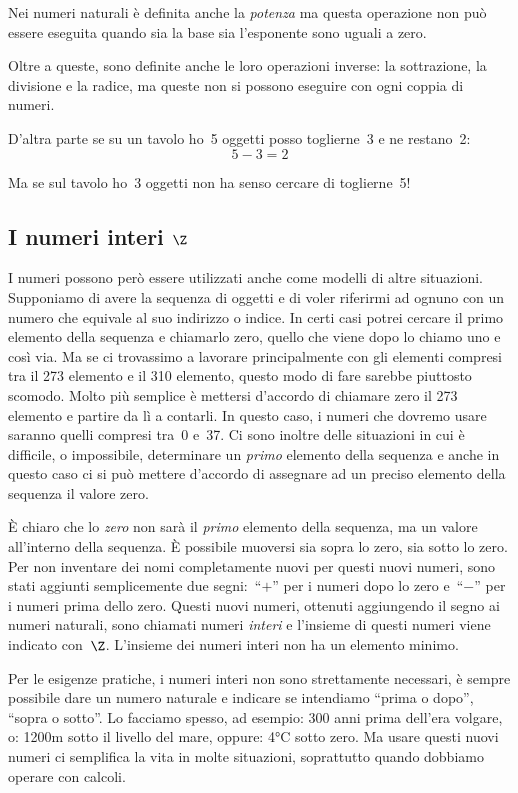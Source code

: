 Nei numeri naturali è definita anche la \emph{potenza} ma questa operazione 
non può essere eseguita quando sia la base sia l'esponente sono uguali a zero.

Oltre a queste, sono definite anche le loro operazioni inverse: la 
sottrazione, la divisione e la radice, ma queste non si possono eseguire
con ogni coppia di numeri.

D'altra parte se su un tavolo ho~5 oggetti posso toglierne~3 e ne restano~2:
\[5-3=2\]

Ma se sul tavolo ho~3 oggetti non ha senso cercare di toglierne~5!

\subsection{I numeri interi \(\Z\)}
\label{subsec:insnum_interi}

I numeri possono però essere utilizzati anche come modelli di altre 
situazioni. 
Supponiamo di avere la sequenza di oggetti e di voler riferirmi ad ognuno 
con un numero che equivale al suo indirizzo o indice. In certi casi potrei 
cercare il primo elemento della sequenza e chiamarlo zero, quello che viene 
dopo lo chiamo uno e così via. Ma se ci trovassimo a lavorare principalmente 
con gli elementi compresi tra il 273 elemento e il 310 elemento, questo 
modo di fare sarebbe piuttosto scomodo. 
Molto più semplice è mettersi d'accordo di chiamare zero il 273 elemento e 
partire da lì a contarli. In questo caso, i numeri che dovremo usare saranno 
quelli compresi tra~0 e~37. 
Ci sono inoltre delle situazioni in cui è difficile, o impossibile, 
determinare un \emph{primo} elemento della sequenza e anche in questo caso 
ci si può mettere d'accordo di assegnare ad un preciso elemento della 
sequenza il valore zero.

È chiaro che lo \emph{zero} non sarà il \emph{primo} elemento della 
sequenza, ma un valore all'interno della sequenza. 
È possibile muoversi sia sopra lo zero, sia sotto lo zero.
Per non inventare dei nomi completamente nuovi per questi nuovi 
numeri, sono stati aggiunti semplicemente due segni:~``\(+\)'' per i numeri 
dopo lo zero e~``\(-\)'' per i numeri prima dello zero. 
Questi nuovi numeri, ottenuti aggiungendo il segno ai numeri naturali, sono 
chiamati numeri \emph{interi} 
e l'insieme di questi numeri viene indicato con~\(\Z\).
L'insieme dei numeri interi non ha un elemento minimo.

Per le esigenze pratiche, i numeri interi non sono strettamente necessari, è 
sempre possibile dare un numero naturale e indicare se intendiamo ``prima o 
dopo'', ``sopra o sotto''. Lo facciamo spesso, ad esempio: 300 anni prima 
dell'era volgare, o: 1200m sotto il livello del mare, oppure: 4°C sotto zero. 
Ma usare questi nuovi numeri ci semplifica la vita in molte situazioni, 
soprattutto quando dobbiamo operare con calcoli.

